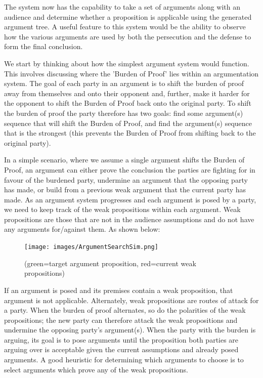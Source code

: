 \documentclass[10pt,a4paper,twocolumn]{article}
\begin{document}
The system now has the capability to take a set of arguments along with an audience and
determine whether a proposition is applicable using the generated argument tree.
A useful feature to this system would be the ability to observe how the various
arguments are used by both the persecution and the defense to form the final
conclusion.

We start by thinking about how the simplest argument system would function. This
involves discussing where the 'Burden of Proof' lies within an argumentation
system. The goal of each party in an argument is to shift the burden of proof
away from themselves and onto their opponent and, further, make it harder for
the opponent to shift the Burden of Proof back onto the original party. To
shift the burden of proof the party therefore has two goals: find some
argument(s) sequence that will shift the Burden of Proof, and find the
argument(s) sequence that is the strongest (this prevents the Burden of Proof
from shifting back to the original party). 

In a simple scenario, where we assume a single argument shifts the Burden of
Proof, an argument can either prove the conclusion the parties are fighting for
in favour of the burdened party, undermine an argument that the opposing party
has made, or build from a previous weak argument that the current party has
made. As an argument system progresses and each argument is posed by a party, we
need to keep track of the weak propositions within each argument. Weak
propositions are those that are not in the audience assumptions and do not have
any arguments for/against them. As shown below:

\begin{figure}[h]
  \texttt{[image: images/ArgumentSearchSim.png]}
  \centering
  \caption{(green=target argument proposition, red=current weak
  propositions)}

\end{figure}

If an argument is posed and its premises contain
a weak proposition, that argument is not applicable. Alternately, weak
propositions are routes of attack for a party. When the burden of proof
alternates, so do the polarities of the weak propositions; the new party can
therefore attack the weak propositions and undermine the opposing party's
argument(s). When the party with the burden is arguing, its goal is to pose
arguments until the proposition both parties are arguing over is acceptable
given the current
assumptions and already posed arguments. A good heuristic for determining which
arguments to choose is to select arguments which prove any of the weak
propositions.
\end{document}

